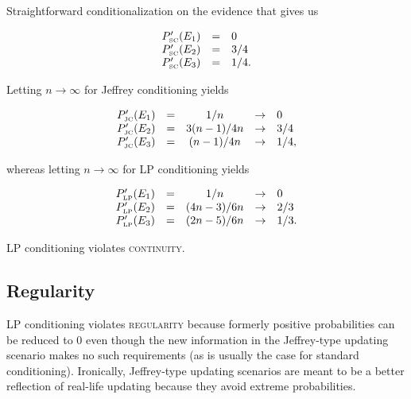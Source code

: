 \documentclass[smallextended]{svjour3}       %
\begin{document}
Straightforward conditionalization on the evidence that  gives us 

\begin{equation}
  \label{eq:sherlockcontsc}
  \begin{array}{rcl}
  P'_{\mbox{\tiny SC}}(E_{1})&=&0\\
  P'_{\mbox{\tiny SC}}(E_{2})&=&3/4\\
  P'_{\mbox{\tiny SC}}(E_{3})&=&1/4.
\end{array}
\end{equation}

Letting $n\rightarrow\infty$ for Jeffrey conditioning yields

\begin{equation}
  \label{eq:sherlockcontjc}
  \begin{array}{rcccl}
  P'_{\mbox{\tiny JC}}(E_{1})&=&1/n&\rightarrow&0\\
  P'_{\mbox{\tiny JC}}(E_{2})&=&3(n-1)/4n&\rightarrow&3/4\\
  P'_{\mbox{\tiny JC}}(E_{3})&=&(n-1)/4n&\rightarrow&1/4,
\end{array}
\end{equation}

whereas letting $n\rightarrow\infty$ for LP conditioning yields

\begin{equation}
  \label{eq:sherlockcontlp}
  \begin{array}{rcccl}
  P'_{\mbox{\tiny LP}}(E_{1})&=&1/n&\rightarrow&0\\
  P'_{\mbox{\tiny LP}}(E_{2})&=&(4n-3)/6n&\rightarrow&2/3\\
  P'_{\mbox{\tiny LP}}(E_{3})&=&(2n-5)/6n&\rightarrow&1/3.
\end{array}
\end{equation}

LP conditioning violates \textsc{continuity}.

\subsection{Regularity}
\label{Regularity}

LP conditioning violates \textsc{regularity} because formerly positive
probabilities can be reduced to $0$ even though the new information in
the Jeffrey-type updating scenario makes no such requirements (as is
usually the case for standard conditioning). Ironically, Jeffrey-type
updating scenarios are meant to be a better reflection of real-life
updating because they avoid extreme probabilities. 
\end{document}
